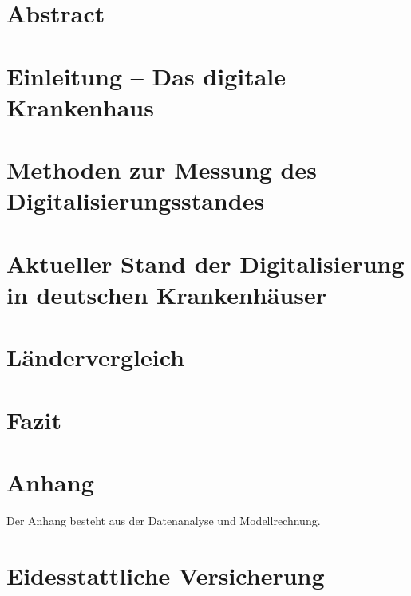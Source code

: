 
\section*{Abstract}

\newpage
{}
\tableofcontents
\newpage
{}
\listoftables
{}
\newpage
{}
\listoffigures
{}
\newpage
{}
% 
\section{Einleitung -- Das digitale Krankenhaus}

\section{Methoden zur Messung des Digitalisierungsstandes}

\section{Aktueller Stand der Digitalisierung in deutschen Krankenhäuser} \label{sec:stand in deutschland}

\section{Ländervergleich} \label{sec:laendervergleich}

\section{Fazit}

\newpage
{}
\printbibliography
{}
\newpage
{}
\section*{Anhang}
\label{sec:Anhang}
Der Anhang besteht aus der Datenanalyse und Modellrechnung.
\newpage
%
\section*{Eidesstattliche Versicherung}


